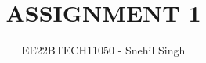 \documentclass[journal,12pt,twocolumn]{IEEEtran}
\theoremstyle{remark}
\begin{document}
\vspace{3cm}

\title{
ASSIGNMENT 1
}
\author{ EE22BTECH11050 - Snehil Singh}


%
%
%

% 
%



% 
\end{document}
